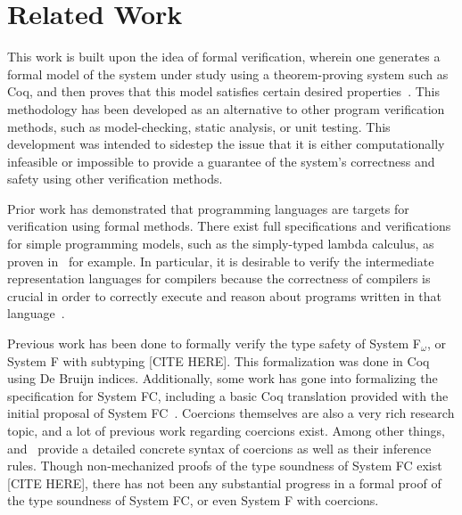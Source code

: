 \documentclass{sig-alternate}
\begin{document}
\section{Related Work}
\label{sec:related-work}
This work is built upon the idea of formal verification, wherein one generates a formal
model of the system under study using a theorem-proving system such as Coq, and then proves 
that this model satisfies certain desired properties~\cite{series/natosec/CousotC10}. This 
methodology has been developed as an alternative to other program verification methods, such as 
model-checking, static analysis, or unit testing. This development was intended to sidestep the 
issue that it is either computationally infeasible or impossible to provide a guarantee of the 
system's correctness and safety using other verification methods.

Prior work has demonstrated that programming languages are targets for verification using 
formal methods. There exist full specifications and verifications for simple programming
models, such as the simply-typed lambda calculus, as proven in~\cite{Pierce:SF} for example. In particular, it is desirable to verify the intermediate representation languages for compilers because the correctness of compilers is crucial in order to correctly execute and reason about programs written in that language~\cite{Zhao:2012:FLI:2103656.2103709}.

Previous work has been done to formally verify the type safety of System F$_\omega$, or System F with subtyping [CITE HERE]. This formalization was done in Coq using De Bruijn indices. Additionally, some work has gone into formalizing the specification for System FC, including a basic 
Coq translation provided with the initial proposal of System FC~\cite{conf/tldi/SulzmannCJD07}. Coercions themselves are also a very rich research topic, and a lot of previous work regarding coercions exist. Among other things,~\cite{Breitner:2014:SZC:2628136.2628141} and~\cite{DBLP:conf/tldi/YorgeyWCJVM12} provide a detailed concrete syntax of coercions as well as their inference rules.
Though non-mechanized proofs of the type soundness of System FC exist [CITE HERE], there has not been any substantial progress in a formal proof of the type soundness of System FC, or even System F with coercions.
\end{document}
